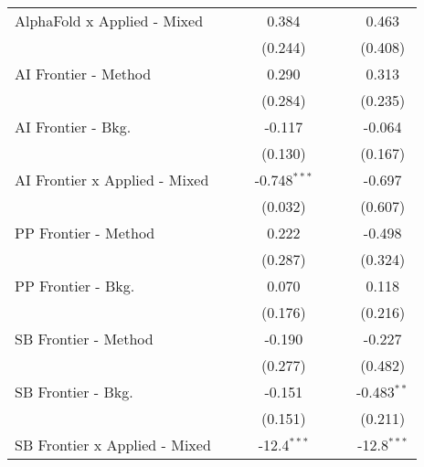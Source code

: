 \begin{tabular}{lcccccc}
   AlphaFold x Applied - Mixed   &         &               & 0.384          &         &               & 0.463\\   
                                 &         &               & (0.244)        &         &               & (0.408)\\   
   AI Frontier - Method          &         &               & 0.290          &         &               & 0.313\\   
                                 &         &               & (0.284)        &         &               & (0.235)\\   
   AI Frontier - Bkg.            &         &               & -0.117         &         &               & -0.064\\   
                                 &         &               & (0.130)        &         &               & (0.167)\\   
   AI Frontier x Applied - Mixed &         &               & -0.748$^{***}$ &         &               & -0.697\\   
                                 &         &               & (0.032)        &         &               & (0.607)\\   
   PP Frontier - Method          &         &               & 0.222          &         &               & -0.498\\   
                                 &         &               & (0.287)        &         &               & (0.324)\\   
   PP Frontier - Bkg.            &         &               & 0.070          &         &               & 0.118\\   
                                 &         &               & (0.176)        &         &               & (0.216)\\   
   SB Frontier - Method          &         &               & -0.190         &         &               & -0.227\\   
                                 &         &               & (0.277)        &         &               & (0.482)\\   
   SB Frontier - Bkg.            &         &               & -0.151         &         &               & -0.483$^{**}$\\   
                                 &         &               & (0.151)        &         &               & (0.211)\\   
   SB Frontier x Applied - Mixed &         &               & -12.4$^{***}$  &         &               & -12.8$^{***}$\\   

\end{tabular}
